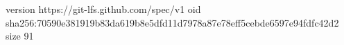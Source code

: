 version https://git-lfs.github.com/spec/v1
oid sha256:70590e381919b83da619b8e5dfd11d7978a87e78eff5cebde6597e94fdfc42d2
size 91
